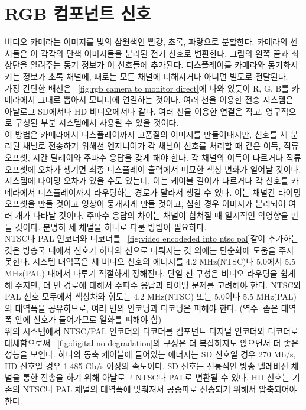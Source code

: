 \section{RGB 컴포넌트 신호}
비디오 카메라는 이미지를 빛의 삼원색인 빨강, 초록, 파랑으로 분할한다. 카메라의 센서들은 이 각각의 단색 이미지들을 분리된 전기 신호로 변환한다.
그림의 왼쪽 끝과 최상단을 알려주는 동기 정보가 이 신호들에 추가된다. 디스플레이를 카메라와 동기화시키는 정보가 초록 채널에, 때로는 모든 채널에 더해지거나 아니면 별도로 전달된다.
\\
가장 간단한 배선은 \figurename~\ref{fig:rgb camera to monitor direct}에 나와 있듯이 R, G, B를 카메라에서 그대로 뽑아서 모니터에 연결하는 것이다. 여러 선을 이용한 전송 시스템은 아날로그 SD에서나 HD 비디오에서나 같다.
여러 선을 이용한 연결은 작고, 영구적으로 구성된 부분 시스템에서 사용될 수 있을 것이다.
\\
이 방법은 카메라에서 디스플레이까지 고품질의 이미지를 만들어내지만, 신호를 세 분리된 채널로 전송하기 위해선 엔지니어가 각 채널이 신호를 처리할 때 같은 이득, 직류 오프셋, 시간 딜레이와 주파수 응답을 갖게 해야 한다.
각 채널의 이득이 다르거나 직류 오프셋에 오차가 생기면 최종 디스플레이 출력에서 미묘한 색상 변화가 일어날 것이다.
시스템에 타이밍 오차가 있을 수도 있는데, 이는 케이블 길이가 다르거나 각 신호를 카메라에서 디스플레이까지 라우팅하는 경로가 달라서 생길 수 있다.
이는 채널간 타이밍 오프셋을 만들 것이고 영상이 뭉개지게 만들 것이고, 심한 경우 이미지가 분리되어 여러 개가 나타날 것이다.
주파수 응답의 차이는 채널이 합쳐질 때 일시적인 악영향을 만들 것이다.
분명히 세 채널을 하나로 다룰 방법이 필요하다.
\\
NTSC나 PAL 인코더와 디코더를 \figurename~\ref{fig:video encodeded into ntsc pal}\와 같이 추가하는 것은 방송국 내에서 신호가 하나의 선으로 다뤄지는 것 외에는 단순화에 도움을 주지 못한다.
시스템 대역폭은 세 비디오 신호의 에너지를 4.2 MHz(NTSC)나 5.0에서 5.5 MHz(PAL) 내에서 다루기 적절하게 정해진다.
단일 선 구성은 비디오 라우팅을 쉽게 해 주지만, 더 먼 경로에 대해서 주파수 응답과 타이밍 문제를 고려해야 한다.
NTSC와 PAL 신호 모두에서 색상차와 휘도는 4.2 MHz(NTSC) 또는 5.0이나 5.5 MHz(PAL)의 대역폭을 공유하므로, 여러 번의 인코딩과 디코딩은 피해야 한다.
(역주: 좁은 대역폭 안에 신호가 들어가므로 열화를 피해야 함)
\\
위의 시스템에서 NTSC/PAL 인코더와 디코더를 컴포넌트 디지털 인코더와 디코더로 대체함으로써 \figurename~\ref{fig:digital no degradation}의 구성은 더 복잡하지도 않으면서 더 좋은 성능을 보인다.
하나의 동축 케이블에 들어있는 에너지는 SD 신호일 경우 270 Mb/s, HD 신호일 경우 1.485 Gb/s 이상의 속도이다.
SD 신호는 전통적인 방송 텔레비전 채널을 통한 전송을 하기 위해 아날로그 NTSC나 PAL로 변환될 수 있다.
HD 신호는 기존의 NTSC나 PAL 채널의 대역폭에 맞춰져서 공중파로 전송되기 위해서 압축되어야 한다.

